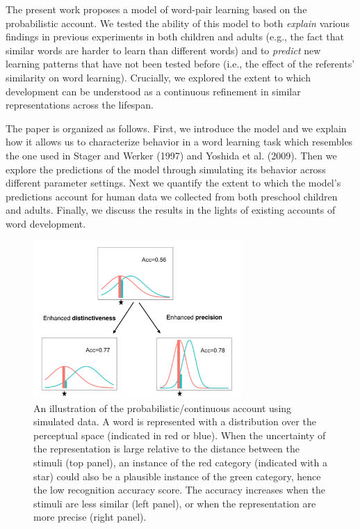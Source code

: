 \documentclass[english,,man,floatsintext]{apa6}
\theoremstyle{definition}
\theoremstyle{definition}
\theoremstyle{definition}
\theoremstyle{remark}
\begin{document}
The present work proposes a model of word-pair learning based on the
probabilistic account. We tested the ability of this model to both
\emph{explain} various findings in previous experiments in both children
and adults (e.g., the fact that similar words are harder to learn than
different words) and to \emph{predict} new learning patterns that have
not been tested before (i.e., the effect of the referents' similarity on
word learning). Crucially, we explored the extent to which development
can be understood as a continuous refinement in similar representations
across the lifespan.

The paper is organized as follows. First, we introduce the model and we
explain how it allows us to characterize behavior in a word learning
task which resembles the one used in Stager and Werker (1997) and
Yoshida et al. (2009). Then we explore the predictions of the model
through simulating its behavior across different parameter settings.
Next we quantify the extent to which the model's predictions account for
human data we collected from both preschool children and adults.
Finally, we discuss the results in the lights of existing accounts of
word development.

\begin{figure}

{\centering \includegraphics[width=300px]{figs/illustration} 

}

\caption{An illustration of the probabilistic/continuous account using simulated data. A word is represented with a distribution over the perceptual space (indicated in red or blue). When the uncertainty of the representation is large relative to the distance between the stimuli (top panel), an instance of the red category (indicated with a star) could also be a plausible instance of the green category, hence the low recognition accuracy score. The accuracy increases when the stimuli are less similar (left panel), or when the representation are more precise (right panel).}\label{fig:illus}
\end{figure}
\end{document}
